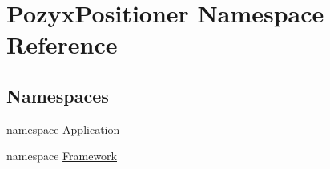 \hypertarget{namespace_pozyx_positioner}{}\section{Pozyx\+Positioner Namespace Reference}
\label{namespace_pozyx_positioner}
\subsection*{Namespaces}
\begin{DoxyCompactItemize}
\item 
namespace \hyperlink{namespace_pozyx_positioner_1_1_application}{Application}
\item 
namespace \hyperlink{namespace_pozyx_positioner_1_1_framework}{Framework}
\end{DoxyCompactItemize}
